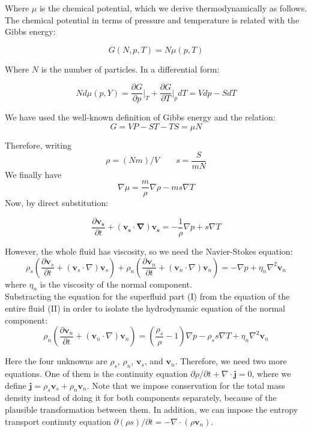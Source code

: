 \documentclass{article}
\begin{document}
Where $\mu$ is the chemical potential, which we derive thermodynamically as follows. The chemical potential in terms of pressure and temperature is related with the Gibbs energy:

\[G(N, p, T)= N \mu(p, T)\]

Where $N$ is the number of particles. In a differential form:

\[N d\mu(p, Y) = \frac{\partial G}{\partial p} \bigg|_T + \frac{\partial G}{\partial T}\bigg|_pdT = Vdp - S dT\]

We have used the well-known definition of Gibbs energy and the relation:
\[G = VP - ST - TS = \mu N\]

Therefore, writing 
\[\rho = (Nm)/V \qquad s = \frac{S}{mN}\]
We finally have
\[\nabla \mu = \frac{m}{\rho} \nabla \rho - m s \nabla T\]
Now, by direct substitution:

\[\frac{\partial \mathbf{v_s}}{\partial t} + (\mathbf{v_s}\cdot \mathbf{\nabla})\mathbf{v_s} = -\frac{1}{\rho}\nabla p + s \nabla T \tag{I}\]

However, the whole fluid has viscosity, so we need the Navier-Stokes equation:
\[
\rho_s \left( \frac{\partial \mathbf{v}_s}{\partial t} + (\mathbf{v}_s \cdot \nabla) \mathbf{v}_s \right) + \rho_n \left( \frac{\partial \mathbf{v}_n}{\partial t} + (\mathbf{v}_n \cdot \nabla) \mathbf{v}_n \right) = -\nabla p + \eta_n \nabla^2 \mathbf{v}_n \tag{II}
\]
where $\eta_n$ is the viscosity of the normal component.
\\

Substracting the equation for the superfluid part (I) from the equation of the entire fluid (II) in order to isolate the hydrodynamic equation of the normal component:
\[
\rho_n \left( \frac{\partial \mathbf{v}_n}{\partial t} + (\mathbf{v}_n \cdot \nabla) \mathbf{v}_n \right) = \left( \frac{\rho_s}{\rho} - 1 \right) \nabla p - \rho_s s \nabla T + \eta_n \nabla^2 \mathbf{v}_n \]

Here the four unknowns are $\rho_s$, $\rho_n$, $\mathbf{v}_s$, and $\mathbf{v}_n$. Therefore, we need two more equations. One of them is the continuity equation $\partial \rho / \partial t + \nabla \cdot \mathbf{j} = 0$, where we define $\mathbf{j} = \rho_s \mathbf{v}_s + \rho_n \mathbf{v}_n $. Note that we impose conservation for the total mass density instead of doing it for both components separately, because of the plausible transformation between them. In addition, we can impose the entropy transport continuty equation $\partial (\rho s) / \partial t = - \nabla \cdot (\rho \mathbf{v}_n)$.
\end{document}
